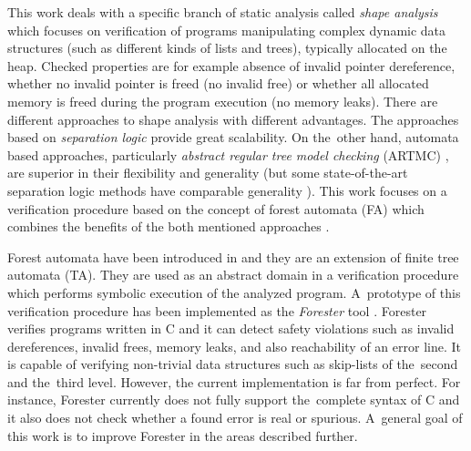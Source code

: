 This work deals with a specific branch of static analysis called \emph{shape analysis} which focuses on verification of programs manipulating
complex dynamic data structures (such as different kinds of lists and trees), typically allocated on the heap.
Checked properties are for example absence of invalid pointer dereference,
whether no invalid pointer is freed (no invalid free) or
whether all allocated memory is freed during the program execution (no memory leaks).
There are different approaches to shape analysis with different advantages.
The approaches based on \emph{separation logic} \cite{seplog,seplog07} provide great scalability.
On the~other hand, automata based approaches, particularly \emph{abstract regular tree model checking} (ARTMC) \cite{artmc}, are
superior in their flexibility and generality (but some state-of-the-art separation logic methods
have comparable generality \cite{biabduction}).
This work focuses on a verification procedure based on the concept of forest automata (FA) which
combines the benefits of the both mentioned approaches \cite{forester11}.

Forest automata have been introduced in \cite{forester11} and
they are an extension of finite tree automata (TA).
They are used as an abstract domain in a verification procedure which performs symbolic execution of the analyzed program.
A~prototype of this verification procedure has been implemented as the \emph{Forester} tool	\cite{www:forester}.
Forester verifies programs written in C and it can detect safety violations such as invalid dereferences, invalid frees,
memory leaks, and also reachability of an error line.
It is capable of verifying non-trivial data structures such as skip-lists of the~second and the~third level.
However, the current implementation is far from perfect.
For instance, Forester currently does not fully support the~complete syntax of C and %
it also does not check whether a found error is real or spurious.
A~general goal of this work is to improve Forester in the areas described further.

